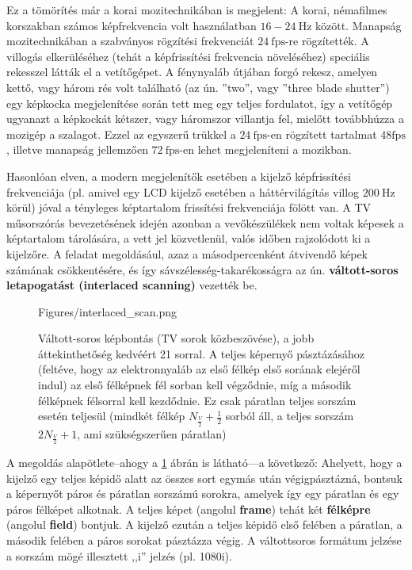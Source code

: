 Ez a tömörítés már a korai mozitechnikában is megjelent: 
A korai, némafilmes korszakban számos képfrekvencia volt használatban $16-24~\mathrm{Hz}$ között.
Manapság mozitechnikában a szabványos rögzítési frekvenciát $24~\mathrm{fps}$-re rögzítették.
A villogás elkerüléséhez (tehát a képfrissítési frekvencia növeléséhez) speciális rekesszel látták el a vetítőgépet.
A fénynyaláb útjában forgó rekesz, amelyen kettő, vagy három rés volt található (az ún. ''two'', vagy ''three blade shutter'') egy képkocka megjelenítése során tett meg egy teljes fordulatot, így a vetítőgép ugyanazt a képkockát kétszer, vagy háromszor villantja fel, mielőtt továbbhúzza a mozigép a szalagot.
Ezzel az egyszerű trükkel a $24~\mathrm{fps}$-en rögzített tartalmat $48\mathrm{fps}$, illetve manapság jellemzően $72~\mathrm{fps}$-en lehet megjeleníteni a mozikban.

Hasonlóan elven, a modern megjelenítők esetében a kijelző képfrissítési frekvenciája (pl. amivel egy LCD kijelző esetében a háttérvilágítás villog $200~\mathrm{Hz}$ körül) jóval a tényleges képtartalom frissítési frekvenciája fölött van.
A TV műsorszórás bevezetésének idején azonban a vevőkészülékek nem voltak képesek a képtartalom tárolására, a vett jel közvetlenül, valós időben rajzolódott ki a kijelzőre.
A feladat megoldásául, azaz a másodpercenként átvivendő képek számának csökkentésére, és így sávszélesség-takarékosságra az ún. \textbf{váltott-soros letapogatást (interlaced scanning)} vezették be.

\begin{figure}[]
	\centering
	\begin{overpic}[width = 0.85 \columnwidth ]{Figures/interlaced_scan.png}
	\end{overpic}
	\caption{Váltott-soros képbontás (TV sorok közbeszövése), a jobb áttekinthetőség kedvéért 21 sorral.
	A teljes képernyő pásztázásához (feltéve, hogy az elektronnyaláb az első félkép első sorának elejéről indul) az első félképnek fél sorban kell végződnie, míg a második félképnek félsorral kell kezdődnie.
	Ez csak páratlan teljes sorszám esetén teljesül (mindkét félkép $N_{\frac{V}{2}} + \frac{1}{2}$ sorból áll, a teljes sorszám $2 N_{\frac{V}{2}} + 1$, ami szükségszerűen páratlan) }
	\label{Fig:interlaced}
\end{figure}

A megoldás alapötlete--ahogy a \ref{Fig:interlaced} ábrán is látható---a következő:
Ahelyett, hogy a kijelző egy teljes képidő alatt az összes sort egymás után végigpásztázná, bontsuk a képernyőt páros és páratlan sorszámú sorokra, amelyek így egy páratlan és egy páros félképet alkotnak.
A teljes képet (angolul \textbf{frame}) tehát két \textbf{félképre} (angolul \textbf{field}) bontjuk.
A kijelző ezután a teljes képidő első felében a páratlan, a második felében a páros sorokat pásztázza végig.
A váltottsoros formátum jelzése a sorszám mögé illesztett ,,i'' jelzés (pl. 1080i).

